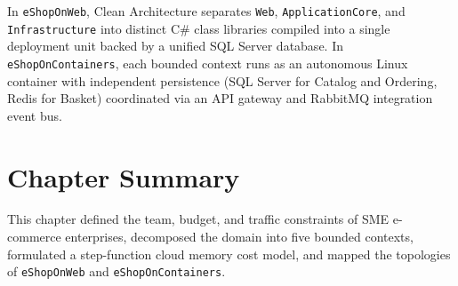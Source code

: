 In \texttt{eShopOnWeb}, Clean Architecture separates \texttt{Web}, \texttt{ApplicationCore}, and \texttt{Infrastructure} into distinct C\# class libraries compiled into a single deployment unit backed by a unified SQL Server database. In \texttt{eShopOnContainers}, each bounded context runs as an autonomous Linux container with independent persistence (SQL Server for Catalog and Ordering, Redis for Basket) coordinated via an API gateway and RabbitMQ integration event bus.

\section{Chapter Summary}
\label{sec:ch2-summary}
This chapter defined the team, budget, and traffic constraints of SME e-commerce enterprises, decomposed the domain into five bounded contexts, formulated a step-function cloud memory cost model, and mapped the topologies of \texttt{eShopOnWeb} and \texttt{eShopOnContainers}.

